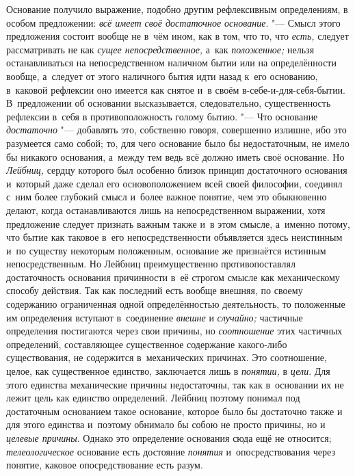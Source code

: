 Основание получило выражение, подобно другим рефлексивным определениям, в
особом предложении: {\em всё имеет своё достаточное
основание}. "--- Смысл этого предложения состоит вообще не в~чём ином, как в
том, что то, что {\em есть,} следует рассматривать не
как {\em сущее непосредственное,} а~как
{\em положенное;} нельзя останавливаться на
непосредственном наличном бытии или на определённости вообще, а~следует от
этого наличного бытия идти назад к~его основанию, в~каковой рефлексии оно
имеется как снятое и~в своём в-себе-и-для-себя-бытии. В~предложении об
основании высказывается, следовательно, существенность рефлексии в~себя в
противоположность голому бытию. "--- Что основание
{\em достаточно} "--- добавлять это, собственно говоря,
совершенно излишне, ибо это разумеется само собой; то, для чего основание
было бы недостаточным, не имело бы никакого основания, а~между тем ведь всё
должно иметь своё основание. Но {\em Лейбниц,} сердцу
которого был особенно близок принцип достаточного основания и~который даже
сделал его основоположением всей своей философии, соединял с~ним более
глубокий смысл и~более важное понятие, чем это обыкновенно делают, когда
останавливаются лишь на непосредственном выражении, хотя предложение
следует признать важным также и~в этом смысле, а~именно потому, что бытие
как таковое в~его непосредственности объявляется здесь неистинным и~по
существу некоторым положенным, основание же признаётся истинным
непосредственным. Но Лейбниц преимущественно противопоставлял достаточность
основания причинности в~её строгом смысле как механическому способу
действия. Так как последний есть вообще внешняя, по своему содержанию
ограниченная одной определённостью деятельность, то положенные им
определения вступают в~соединение {\em внешне} и
{\em случайно;} частичные определения постигаются через
свои причины, но {\em соотношение} этих частичных
определений, составляющее существенное содержание какого-либо
существования, не содержится в~механических причинах. Это соотношение,
целое, как существенное единство, заключается лишь в
{\em понятии,} в {\em цели}. Для
этого единства механические причины недостаточны, так как в~основании их не
лежит цель как единство определений. Лейбниц поэтому понимал под
достаточным основанием такое основание, которое было бы достаточно также и
для этого единства и~поэтому обнимало бы собою не просто причины, но и
{\em целевые причины}. Однако это определение основания
сюда ещё не относится; {\em телеологическое} основание
есть достояние {\em понятия} и~опосредствования через
понятие, каковое опосредствование есть разум.

